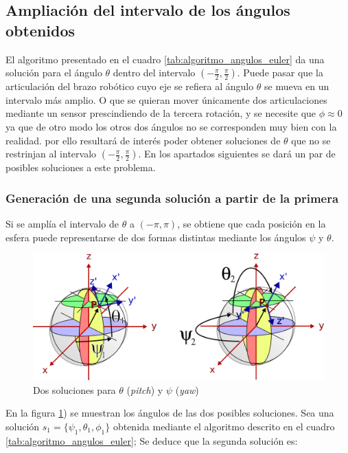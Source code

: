 \documentclass[12pt, a4paper]{report}
\begin{document}
\subsection{Ampliación del intervalo de los ángulos obtenidos}

El algoritmo presentado en el cuadro \ref{tab:algoritmo_angulos_euler} da una solución para el ángulo $\theta$ dentro del intervalo $\left(-\frac{\pi}{2}, \frac{\pi}{2} \right)$. Puede pasar que la articulación del brazo robótico cuyo eje se refiera al ángulo $\theta$ se mueva en un intervalo más amplio. O que se quieran mover únicamente dos articulaciones mediante un sensor prescindiendo de la tercera rotación, y se necesite que $\phi \approx 0$ ya que de otro modo los otros dos ángulos no se corresponden muy bien con la realidad. por ello resultará de interés poder obtener soluciones de $\theta$ que no se restrinjan al intervalo $\left(-\frac{\pi}{2}, \frac{\pi}{2} \right)$. En los apartados siguientes se dará un par de posibles soluciones a este problema.

\subsubsection{Generación de una segunda solución a partir de la primera}

Si se amplía el intervalo de $\theta$ a $(-\pi, \pi)$, se obtiene que cada posición en la esfera puede representarse de dos formas distintas mediante los ángulos $\psi$ y $\theta$. \\

\begin{figure}[h]
	\centering
		\includegraphics[scale=0.85]{../img/ea_solutions.png} 
	\caption{Dos soluciones para $\theta$ (\textit{pitch}) y $\psi$ (\textit{yaw})} 
	\label{fig: dos_soluciones_esfera}
\end{figure}

En la figura \ref{fig: dos_soluciones_esfera}) se muestran los ángulos de las dos posibles soluciones. Sea una solución $s_1 = \{ \psi_1, \theta_1, \phi_1 \}$ obtenida mediante el algoritmo descrito en el cuadro \ref{tab:algoritmo_angulos_euler}; Se deduce que la segunda solución es:
\end{document}
